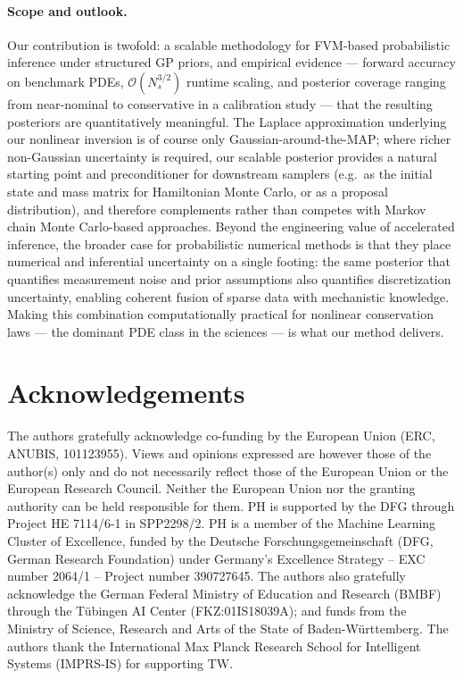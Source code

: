 \documentclass{article}
\theoremstyle{plain}
\theoremstyle{definition}
\theoremstyle{remark}
\begin{document}
\paragraph{Scope and outlook.}
Our contribution is twofold: a scalable methodology for FVM-based probabilistic inference under structured GP priors, and empirical evidence --- forward accuracy on benchmark PDEs, $\mathcal{O}(N_s^{3/2})$ runtime scaling, and posterior coverage ranging from near-nominal to conservative in a calibration study --- that the resulting posteriors are quantitatively meaningful.
The Laplace approximation underlying our nonlinear inversion is of course only Gaussian-around-the-MAP; where richer non-Gaussian uncertainty is required, our scalable posterior provides a natural starting point and preconditioner for downstream samplers (e.g.\ as the initial state and mass matrix for Hamiltonian Monte Carlo, or as a proposal distribution), and therefore complements rather than competes with Markov chain Monte Carlo-based approaches.
Beyond the engineering value of accelerated inference, the broader case for probabilistic numerical methods is that they place numerical and inferential uncertainty on a single footing: the same posterior that quantifies measurement noise and prior assumptions also quantifies discretization uncertainty, enabling coherent fusion of sparse data with mechanistic knowledge.
Making this combination computationally practical for nonlinear conservation laws --- the dominant PDE class in the sciences --- is what our method delivers.

\section*{Acknowledgements}
The authors gratefully acknowledge co-funding by the European Union (ERC, ANUBIS, 101123955).
Views and opinions expressed are however those of the author(s) only and do not necessarily reflect those of the European Union or the European Research Council.
Neither the European Union nor the granting authority can be held responsible for them.
PH is supported by the DFG through Project HE 7114/6-1 in SPP2298/2.
PH is a member of the Machine Learning Cluster of Excellence, funded by the Deutsche Forschungsgemeinschaft (DFG, German Research Foundation) under Germany’s Excellence Strategy – EXC number 2064/1 – Project number 390727645.
The authors also gratefully acknowledge the German Federal Ministry of Education and Research (BMBF) through the Tübingen AI Center (FKZ:01IS18039A); and funds from the Ministry of Science, Research and Arts of the State of Baden-Württemberg.
The authors thank the International Max Planck Research School for Intelligent Systems (IMPRS-IS) for supporting TW.
\end{document}
